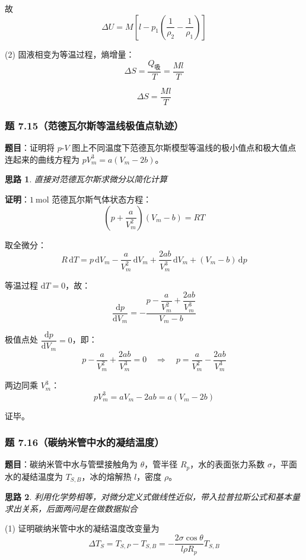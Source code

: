 \documentclass[UTF8]{ctexart}
\newtheorem{thoughts}{思路}[subsection]
\begin{document}
故
\[
\boxed{\Delta U=M\left[l-p_1\left(\frac{1}{\rho_2}-\frac{1}{\rho_1}\right)\right]}
\]

(2) 固液相变为等温过程，熵增量：
\[
\Delta S=\frac{Q_{\text{吸}}}{T}=\frac{Ml}{T}
\]

\[
\boxed{\Delta S=\frac{Ml}{T}}
\]

\subsubsection{题 7.15（范德瓦尔斯等温线极值点轨迹）}

\textbf{题目}：证明将 $p$-$V$ 图上不同温度下范德瓦尔斯模型等温线的极小值点和极大值点连起来的曲线方程为 $pV_m^3=a(V_m-2b)$。

\begin{thoughts}
  直接对范德瓦尔斯求微分以简化计算
\end{thoughts}

\textbf{证明}：$1\ \mathrm{mol}$ 范德瓦尔斯气体状态方程：
\[
\left(p+\frac{a}{V_m^2}\right)(V_m-b)=RT
\]

取全微分：
\[
R\,\mathrm{d}T
=p\,\mathrm{d}V_m-\frac{a}{V_m^2}\,\mathrm{d}V_m
+\frac{2ab}{V_m^3}\,\mathrm{d}V_m+(V_m-b)\,\mathrm{d}p
\]

等温过程 $\mathrm{d}T=0$，故：
\[
\frac{\mathrm{d}p}{\mathrm{d}V_m}
=-\frac{p-\dfrac{a}{V_m^2}+\dfrac{2ab}{V_m^3}}{V_m-b}
\]

极值点处 $\dfrac{\mathrm{d}p}{\mathrm{d}V_m}=0$，即：
\[
p-\frac{a}{V_m^2}+\frac{2ab}{V_m^3}=0
\quad\Longrightarrow\quad
p=\frac{a}{V_m^2}-\frac{2ab}{V_m^3}
\]

两边同乘 $V_m^3$：
\[
\boxed{pV_m^3=aV_m-2ab=a(V_m-2b)}
\]

证毕。

\subsubsection{题 7.16（碳纳米管中水的凝结温度）}

\textbf{题目}：碳纳米管中水与管壁接触角为 $\theta$，管半径 $R_p$，水的表面张力系数 $\sigma$，平面水的凝结温度为 $T_{S,B}$，冰的熔解热 $l$，密度 $\rho$。

\begin{thoughts}
  利用化学势相等，对微分定义式做线性近似，带入拉普拉斯公式和基本量求出关系，后面两问是在做数据拟合
\end{thoughts}

(1) 证明碳纳米管中水的凝结温度改变量为
\[
\Delta T_S=T_{S,P}-T_{S,B}=-\frac{2\sigma\cos\theta}{l\rho R_p}T_{S,B}
\]
\end{document}
